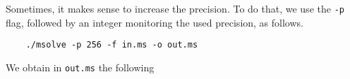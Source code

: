 \documentclass[a4paper,english,11pt]{scrartcl}
\theoremstyle{definition}
\theoremstyle{remark}
\begin{document}
Sometimes, it makes sense to increase the precision. To do that, we use the
\verb+-p+ flag, followed by an integer monitoring the used precision, as
follows.
\begin{tcolorbox}
  \begin{verbatim}
    ./msolve -p 256 -f in.ms -o out.ms 
  \end{verbatim}
\end{tcolorbox}
We obtain in \verb+out.ms+ the following
\end{document}
